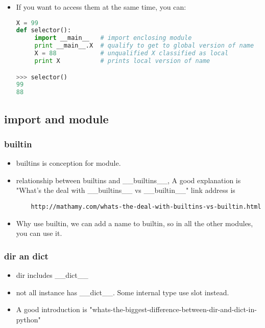 \documentclass[a4paper,12pt,twoside]{book}
\begin{document}
\begin{itemize}
	\item If you want to access them at the same time, you can:
\begin{lstlisting}[frame=single, language=python]
X = 99
def selector():
     import __main__   # import enclosing module
     print __main__.X  # qualify to get to global version of name
     X = 88            # unqualified X classified as local
     print X           # prints local version of name

>>> selector()
99
88
	\end{lstlisting} 
\end{itemize}

\subsection{import and module}
\subsubsection{builtin}
\begin{itemize}
	\item builtins is conception for module.
	\item relationship between builtins and \_\_builtins\_\_, A good explanation is "What's the deal with \_\_builtins\_\_ vs \_\_builtin\_\_" link address is \begin{verbatim}
	http://mathamy.com/whats-the-deal-with-builtins-vs-builtin.html \end{verbatim}
	\item Why use builtin, we can add a name to builtin,  so in all the other modules, you can use it.
\end{itemize}
\subsubsection{dir an dict}
\begin{itemize}
	\item dir includes \_\_dict\_\_
	\item not all instance has \_\_dict\_\_. Some internal type use slot instead. 
	\item A good introduction is "whats-the-biggest-difference-between-dir-and-dict-in-python"
\end{itemize}
\end{document}
